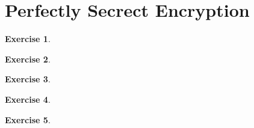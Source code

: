 \documentclass[titlepage,reqno]{amsart}
\theoremstyle{definition}
\newtheorem{exercise}{Exercise}[section]
\theoremstyle{remark}
\begin{document}
\section{Perfectly Secrect Encryption}
\begin{exercise}
    
\end{exercise}

\begin{exercise}
    
\end{exercise}

\begin{exercise}
    
\end{exercise}

\begin{exercise}
    
\end{exercise}

\begin{exercise}
    
\end{exercise}
\end{document}
